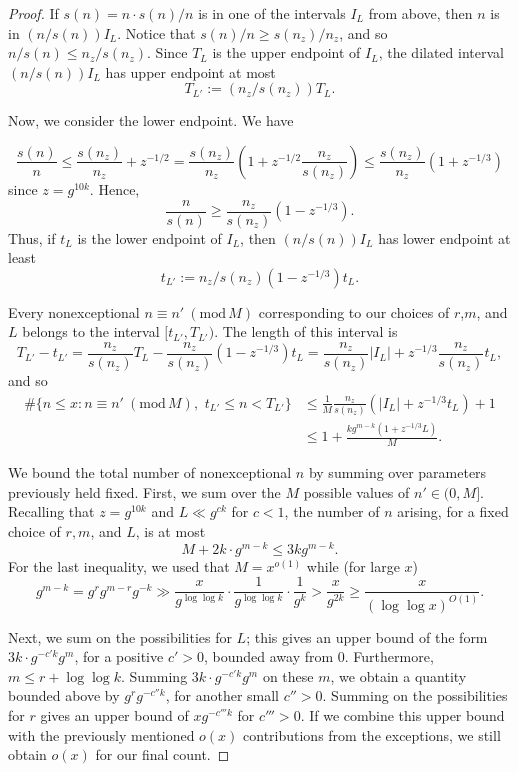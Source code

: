 \documentclass[10pt,a4paper]{amsart}
\renewcommand{\bmod}[1]{\ ( \mathrm{mod} \, #1 )}
\begin{document}
\begin{proof}
If $s(n) = n \cdot s(n)/n$ is in one of the intervals $I_L$ from above, then $n$ is in $(n/s(n)) I_L$. Notice that $s(n)/n \geq s(n_z)/n_z$, and so
	$n/s(n)\leq  n_z/s(n_z)$. Since $T_L$ is the upper endpoint of $I_L$, the dilated interval $(n/s(n))I_L$ has upper endpoint at most \[ T_{L'} := (n_z/s(n_z)) T_L.\]
	
	Now, we consider the lower endpoint. We have
    
	$$\frac{s(n)}{n} \leq \frac{s(n_z)}{n_z}+ z^{-1/2}
	= \frac{s(n_z)}{n_z}\left(1 + z^{-1/2} \frac{n_z}{s(n_z)}\right)
\leq \frac{s(n_z)}{n_z} (1 + z^{-1/3})$$
since $z=g^{10k}.$ Hence,
 \[ \frac{n}{s(n)} \geq \frac{n_z}{s(n_z)} (1-z^{-1/3}).\] Thus, if $t_L$ is the lower endpoint of $I_L$, then $(n/s(n))I_L$ has lower endpoint at least \[ t_{L'} := n_z/s(n_z) (1-z^{-1/3}) t_L.\] 
 
Every nonexceptional $n\equiv n'\bmod{M}$ corresponding to our  choices of $r$,$m$,  and $L$ belongs to the interval $[t_{L'}, T_{L'})$. The length of this interval is
$$T_{L'}-t_{L'}=\frac{n_z}{s(n_z)} T_L-\frac{n_z}{s(n_z)}(1-z^{-1/3}) t_L=\frac{n_z}{s(n_z)} |I_L| + z^{-1/3} \frac{n_z}{s(n_z)} t_L,$$
and so
\begin{align*}
\#\{n\leq x: n \equiv n' \bmod M,\,\, t_{L'}\leq n< T_{L'}    \}&\leq \frac{1}{M}\frac{n_z}{s(n_z)} \left(|I_L| + z^{-1/3} t_L\right)+1
\\&\leq 1 + \frac{k g^{m-k}(1+z^{-1/3}L)}{M}.
\end{align*}

We bound the total number of nonexceptional $n$ by summing over parameters previously held fixed. First, we sum over the $M$ possible values of $n' \in (0,M]$. 
Recalling that $z=g^{10k}$ and $L\ll g^{ck}$ for $c<1$, the number of $n$ arising, for a fixed choice of $r, m$, and $L$, is at most
    \[ M + 2k \cdot g^{m-k} \le 3k g^{m-k}. \]
For the last inequality, we used that $M=x^{o(1)}$ while (for large $x$)
\[ g^{m-k} = g^{r} g^{m-r} g^{-k} \gg \frac{x}{g^{\log\log{k}}} \cdot \frac{1}{g^{\log\log{k}}} \cdot \frac{1}{g^k} > \frac{x}{g^{2k}} \ge \frac{x}{(\log\log{x})^{O(1)}}.\]
    
    
   
	
Next, we sum on the possibilities for $L$; this gives an upper bound of the form $3k \cdot g^{-c' k} g^m$, for a positive $c'>0$, bounded away from $0$. Furthermore, $m \leq r + \log \log k$. Summing $3k \cdot g^{-c' k} g^m$ on these $m$, we obtain a quantity bounded above by $g^r g^{-c'' k}$, for another small $c'' > 0$. Summing on the possibilities for $r$ gives an upper bound of $x g^{-c''' k}$ for $c'''>0$. If we combine this upper bound with the previously mentioned $o(x)$ contributions from the exceptions, we still obtain $o(x)$ for our final count.
		
	\end{proof}
\end{document}
